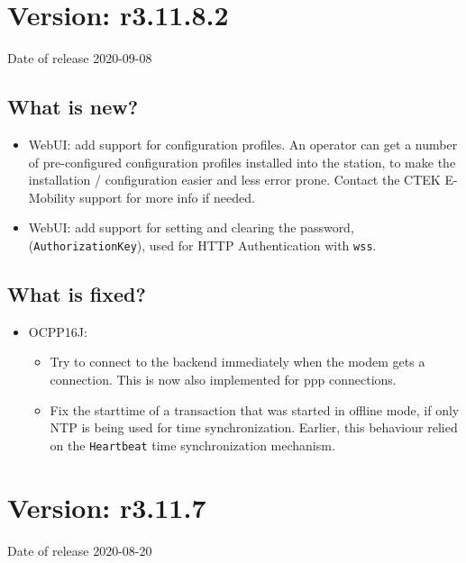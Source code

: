 \documentclass{scrartcl}
\begin{document}
\section{Version: r3.11.8.2}
Date of release 2020-09-08
\subsection*{What is new?}
\begin{itemize}
\item WebUI: add support for configuration profiles. An operator can get a
  number of pre-configured configuration profiles installed into the station,
  to make the installation / configuration easier and less error
  prone. Contact the CTEK E-Mobility support for more info if needed.
\item WebUI: add support for setting and clearing the password,
  (\verb|AuthorizationKey|), used for HTTP Authentication with \verb|wss|.
\end{itemize}
\subsection*{What is fixed?}
\begin{itemize}
\item OCPP16J:
  \begin{itemize}
  \item Try to connect to the backend immediately when the modem gets a
    connection. This is now also implemented for ppp connections.
  \item Fix the starttime of a transaction that was started in offline mode,
    if only NTP is being used for time synchronization. Earlier, this
    behaviour relied on the \verb|Heartbeat| time synchronization mechanism.
  \end{itemize}
\end{itemize}

\section{Version: r3.11.7}
Date of release 2020-08-20
\end{document}
